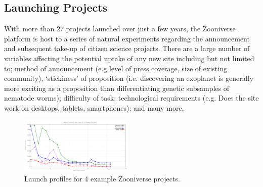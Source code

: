\documentclass{sigchi}
\begin{document}






\subsection{Launching Projects}

With more than 27 projects launched over just a few years, the Zooniverse platform is host to a series of natural experiments regarding the announcement and subsequent take-up of citizen science projects. There are a large number of variables affecting the potential uptake of any new site including but not limited to; method of announcement (e.g level of press coverage, size of existing community), `stickiness' of proposition (i.e. discovering an exoplanet is generally more exciting as a proposition than differentiating genetic subsamples of nematode worms); difficulty of task; technological requirements (e.g. Does the site work on desktops, tablets, smartphones); and many more.

\begin{figure}
\centering
\includegraphics[width=0.48\textwidth]{data/launch-profiles/launch-profiles.png}
\caption{Launch profiles for 4 example Zooniverse projects.}
\label{launchprofiles}
\end{figure}
\end{document}
